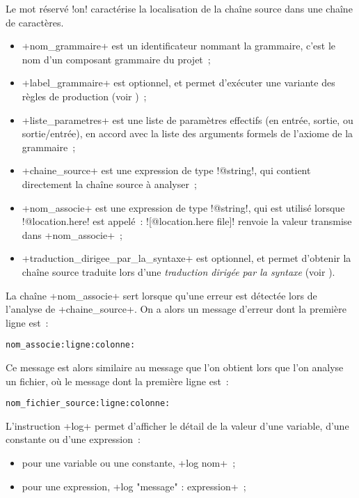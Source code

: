 Le mot réservé \ggst!on! caractérise la localisation de la chaîne source dans une chaîne de caractères.
\begin{itemize}
  \item \ggst+nom_grammaire+ est un identificateur nommant la grammaire, c'est le nom d'un composant grammaire du projet~;
  \item \ggst+label_grammaire+ est optionnel, et permet d'exécuter une variante des règles de production (voir )~;
  \item \ggst+liste_parametres+ est une liste de paramètres effectifs (en entrée, sortie, ou sortie/entrée), en accord avec la liste des arguments formels de l'axiome de la grammaire~;
  \item \ggst+chaine_source+ est une expression de type \ggst!@string!, qui contient directement la chaîne source à analyser~;
  \item \ggst+nom_associe+ est une expression de type \ggst!@string!, qui est utilisé lorsque \ggst!@location.here! est appelé~: \ggst![@location.here file]! renvoie la valeur transmise dans \ggst+nom_associe+~;
  \item \ggst+traduction_dirigee_par_la_syntaxe+ est optionnel, et permet d'obtenir la chaîne source traduite lors d'une \emph{traduction dirigée par la syntaxe} (voir ).
\end{itemize}



La chaîne \ggst+nom_associe+ sert lorsque qu'une erreur est détectée lors de l'analyse de \ggst+chaine_source+. On a alors un message d'erreur dont la première ligne est~:

\texttt{nom\_associe:ligne:colonne:}

Ce message est alors similaire au message que l'on obtient lors que l'on analyse un fichier, où le message dont la première ligne est~:

\texttt{nom\_fichier\_source:ligne:colonne:}














L'instruction \ggst+log+ permet d'afficher le détail de la valeur d'une variable, d'une constante ou d'une expression~:
\begin{itemize}
  \item pour une variable ou une constante, \ggst+log nom+~;
  \item pour une expression, \ggst+log "message" : expression+~;
\end{itemize}

